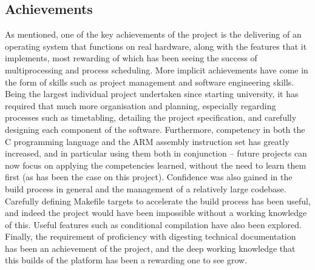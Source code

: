 \subsection{Achievements}
    As mentioned, one of the key achievements of the project is the delivering
    of an operating system that functions on real hardware, along with the
    features that it implements, most rewarding of which has been seeing the
    success of multiprocessing and process scheduling. More implicit
    achievements have come in the form of skills such as project management and
    software engineering skills. Being the largest individual project undertaken
    since starting university, it has required that much more organisation and
    planning, especially regarding processes such as timetabling, detailing the
    project specification, and carefully designing each component of the
    software. Furthermore, competency in both the C programming language and the
    ARM assembly instruction set has greatly increased, and in particular using
    them both in conjunction -- future projects can now focus on applying the
    competencies learned, without the need to learn them first (as has been the
    case on this project). Confidence was also gained in the build process in
    general and the management of a relatively large codebase. Carefully
    defining Makefile targets to accelerate the build process has been useful,
    and indeed the project would have been impossible without a working
    knowledge of this. Useful features such as conditional compilation have
    also been explored. Finally, the requirement of proficiency with digesting
    technical documentation has been an achievement of the project, and the deep
    working knowledge that this builds of the platform has been a rewarding one
    to see grow.
    
